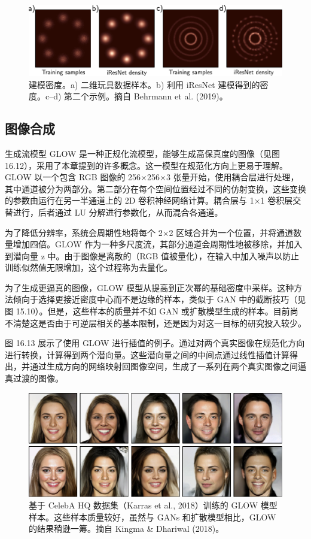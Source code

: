 \documentclass[lang=cn,newtx,10pt,scheme=chinese]{elegantbook}
\begin{document}
\begin{figure}[ht!]
\centering
\includegraphics[width=0.7\linewidth]{PDFFigures/UDLChap16PDF/FlowIResNetResults.pdf}
\caption{建模密度。a) 二维玩具数据样本。b) 利用 iResNet 建模得到的密度。c–d) 第二个示例。摘自 Behrmann et al. (2019)。}
\end{figure}


\subsection{图像合成}
生成流模型 GLOW 是一种正规化流模型，能够生成高保真度的图像（见图 16.12），采用了本章提到的许多概念。这一模型在规范化方向上更易于理解。GLOW 以一个包含 RGB 图像的 256×256×3 张量开始，使用耦合层进行处理，其中通道被分为两部分。第二部分在每个空间位置经过不同的仿射变换，这些变换的参数由运行在另一半通道上的 2D 卷积神经网络计算。耦合层与 1×1 卷积层交替进行，后者通过 LU 分解进行参数化，从而混合各通道。

为了降低分辨率，系统会周期性地将每个 2×2 区域合并为一个位置，并将通道数量增加四倍。GLOW 作为一种多尺度流，其部分通道会周期性地被移除，并加入到潜向量 z 中。由于图像是离散的（RGB 值被量化），在输入中加入噪声以防止训练似然值无限增加，这个过程称为去量化。

为了生成更逼真的图像，GLOW 模型从提高到正次幂的基础密度中采样。这种方法倾向于选择更接近密度中心而不是边缘的样本，类似于 GAN 中的截断技巧（见图 15.10）。但是，这些样本的质量并不如 GAN 或扩散模型生成的样本。目前尚不清楚这是否由于可逆层相关的基本限制，还是因为对这一目标的研究投入较少。

图 16.13 展示了使用 GLOW 进行插值的例子。通过对两个真实图像在规范化方向进行转换，计算得到两个潜向量。这些潜向量之间的中间点通过线性插值计算得出，并通过生成方向的网络映射回图像空间，生成了一系列在两个真实图像之间逼真过渡的图像。

\begin{figure}[ht!]
\centering
\includegraphics[width=0.7\linewidth]{PDFFigures/UDLChap16PDF/FlowGLOWSamples.pdf}
\caption{基于 CelebA HQ 数据集（Karras et al., 2018）训练的 GLOW 模型样本。这些样本质量较好，虽然与 GANs 和扩散模型相比，GLOW 的结果稍逊一筹。摘自 Kingma \& Dhariwal (2018)。}
\end{figure}
\end{document}

